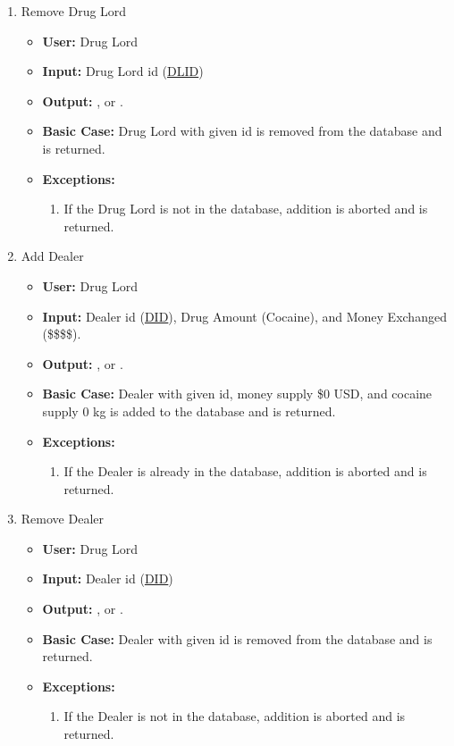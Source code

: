 \documentclass[11pt, oneside]{article}   	%
\theoremstyle{definition}
\theoremstyle{remark}
\begin{document}
\begin{enumerate}
		
	\item Remove Drug Lord
	\begin{itemize}
		\item \textbf{User:} Drug Lord
		\item \textbf{Input:} Drug Lord id (\underline{DLID})
		\item \textbf{Output:} , or .
		\item \textbf{Basic Case:} Drug Lord with given id is removed from the database and  is returned.
		\item \textbf{Exceptions:}
		\begin{enumerate}
			\item If the Drug Lord is not in the database, addition is aborted and  is returned.
		\end{enumerate}
	\end{itemize}
		
	\item Add Dealer
	\begin{itemize}
		\item \textbf{User:} Drug Lord
		\item \textbf{Input:} Dealer id (\underline{DID}), Drug Amount (Cocaine), and Money Exchanged (\$\$\$\$).
		\item \textbf{Output:} , or .
		\item \textbf{Basic Case:} Dealer with given id, money supply \$0 USD, and cocaine supply  0 kg is added to the database and  is returned.
		\item \textbf{Exceptions:}
		\begin{enumerate}
			\item If the Dealer is already in the database, addition is aborted and  is returned.
		\end{enumerate}
	\end{itemize}
		
	\item Remove Dealer
	\begin{itemize}
		\item \textbf{User:} Drug Lord
		\item \textbf{Input:} Dealer id (\underline{DID})
		\item \textbf{Output:} , or .
		\item \textbf{Basic Case:} Dealer with given id is removed from the database and  is returned.
		\item \textbf{Exceptions:}
		\begin{enumerate}
			\item If the Dealer is not in the database, addition is aborted and  is returned.
		\end{enumerate}
	\end{itemize}
		

\end{enumerate}
\end{document}
